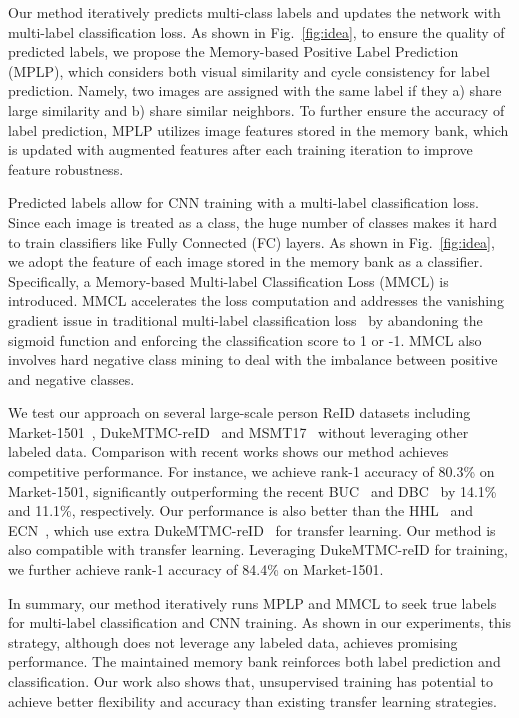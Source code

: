 \documentclass[10pt,twocolumn,letterpaper]{article}
\begin{document}
Our method iteratively predicts multi-class labels and updates the network with multi-label classification loss. As shown in Fig.~\ref{fig:idea}, to ensure the quality of predicted labels, we propose the Memory-based Positive Label Prediction (MPLP), which considers both visual similarity and cycle consistency for label prediction. Namely, two images are assigned with the same label if they a) share large similarity and b) share similar neighbors. To further ensure the accuracy of label prediction, MPLP utilizes image features stored in the memory bank, which is updated with augmented features after each training iteration to improve feature robustness.

Predicted labels allow for CNN training with a multi-label classification loss. Since each image is treated as a class, the huge number of classes makes it hard to train classifiers like Fully Connected (FC) layers. As shown in Fig.~\ref{fig:idea}, we adopt the feature of each image stored in the memory bank as a classifier. Specifically, a Memory-based Multi-label Classification Loss (MMCL) is introduced. MMCL accelerates the loss computation and addresses the vanishing gradient issue in traditional multi-label classification loss~\cite{zhang2013review,Durand_2019_CVPR} by abandoning the sigmoid function and enforcing the classification score to 1 or -1. MMCL also involves hard negative class mining to deal with the imbalance between positive and negative classes.

We test our approach on several large-scale person ReID datasets including Market-1501~\cite{zheng2015scalable}, DukeMTMC-reID~\cite{ristani2016performance} and MSMT17~\cite{wei2018person} without leveraging other labeled data. Comparison with recent works shows our method achieves competitive performance. For instance, we achieve rank-1 accuracy of 80.3\% on Market-1501, significantly outperforming the recent BUC~\cite{lin2019bottom} and DBC~\cite{ding12dispersion} by 14.1\% and 11.1\%, respectively. Our performance is also better than the HHL~\cite{zhong2018generalizing} and ECN~\cite{zhong2019invariance}, which use extra DukeMTMC-reID~\cite{ristani2016performance} for transfer learning. Our method is also compatible with transfer learning. Leveraging DukeMTMC-reID for training, we further achieve rank-1 accuracy of 84.4\% on Market-1501.

In summary, our method iteratively runs MPLP and MMCL to seek true labels for multi-label classification and CNN training. As shown in our experiments, this strategy, although does not leverage any labeled data, achieves promising performance. The maintained memory bank reinforces both label prediction and classification. Our work also shows that, unsupervised training has potential to achieve better flexibility and accuracy than existing transfer learning strategies.
\end{document}
